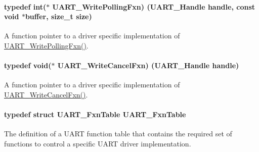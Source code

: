 \paragraph[{U\+A\+R\+T\+\_\+\+Write\+Polling\+Fxn}]{\setlength{\rightskip}{0pt plus 5cm}typedef int($\ast$ U\+A\+R\+T\+\_\+\+Write\+Polling\+Fxn) ({\bf U\+A\+R\+T\+\_\+\+Handle} handle, const void $\ast$buffer, size\+\_\+t size)}\label{_u_a_r_t_8h_a68d0b77abdb9da6a868edc6529ae70ff}


A function pointer to a driver specific implementation of \hyperlink{_u_a_r_t_8h_a68d0b77abdb9da6a868edc6529ae70ff}{U\+A\+R\+T\+\_\+\+Write\+Polling\+Fxn()}. 

\paragraph[{U\+A\+R\+T\+\_\+\+Write\+Cancel\+Fxn}]{\setlength{\rightskip}{0pt plus 5cm}typedef void($\ast$ U\+A\+R\+T\+\_\+\+Write\+Cancel\+Fxn) ({\bf U\+A\+R\+T\+\_\+\+Handle} handle)}\label{_u_a_r_t_8h_ac5a3d974279a2d161746dfbc8ca91774}


A function pointer to a driver specific implementation of \hyperlink{_u_a_r_t_8h_ac5a3d974279a2d161746dfbc8ca91774}{U\+A\+R\+T\+\_\+\+Write\+Cancel\+Fxn()}. 

\paragraph[{U\+A\+R\+T\+\_\+\+Fxn\+Table}]{\setlength{\rightskip}{0pt plus 5cm}typedef struct {\bf U\+A\+R\+T\+\_\+\+Fxn\+Table}  {\bf U\+A\+R\+T\+\_\+\+Fxn\+Table}}\label{_u_a_r_t_8h_a24d497f125179ba5e5b16ad9a0aa249d}


The definition of a U\+A\+R\+T function table that contains the required set of functions to control a specific U\+A\+R\+T driver implementation. 

